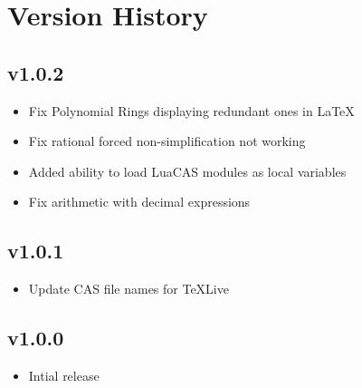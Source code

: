 \documentclass{article}
\begin{document}
\section{Version History}

\subsection*{v1.0.2}

\begin{itemize}
    \item Fix Polynomial Rings displaying redundant ones in \LaTeX{}
    \item Fix rational forced non-simplification not working
    \item Added ability to load LuaCAS modules as local variables
    \item Fix arithmetic with decimal expressions
\end{itemize}

\subsection*{v1.0.1}

\begin{itemize}
    \item Update CAS file names for \TeX{}Live
\end{itemize}

\subsection*{v1.0.0}

\begin{itemize}
    \item Intial release
\end{itemize}
\end{document}
